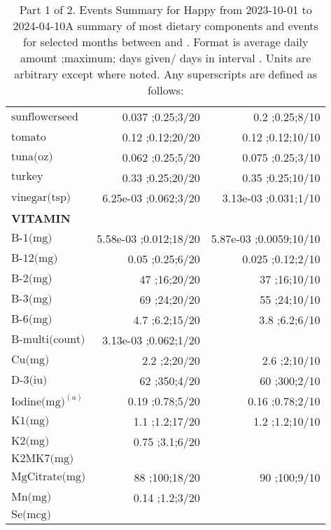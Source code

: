 \begin{table}[H]
\begin{tabular}{|l|r|r|}
$\textrm{sunflowerseed}$&0.037 ;0.25;3/20&0.2 ;0.25;8/10\\
$\textrm{tomato}$&0.12 ;0.12;20/20&0.12 ;0.12;10/10\\
$\textrm{tuna(oz)}$&0.062 ;0.25;5/20&0.075 ;0.25;3/10\\
$\textrm{turkey}$&0.33 ;0.25;20/20&0.35 ;0.25;10/10\\
$\textrm{vinegar(tsp)}$&6.25e-03 ;0.062;3/20&3.13e-03 ;0.031;1/10\\
{\bf VITAMIN}&&\\
$\textrm{B-1(mg)}$&5.58e-03 ;0.012;18/20&5.87e-03 ;0.0059;10/10\\
$\textrm{B-12(mg)}$&0.05 ;0.25;6/20&0.025 ;0.12;2/10\\
$\textrm{B-2(mg)}$&47 ;16;20/20&37 ;16;10/10\\
$\textrm{B-3(mg)}$&69 ;24;20/20&55 ;24;10/10\\
$\textrm{B-6(mg)}$&4.7 ;6.2;15/20&3.8 ;6.2;6/10\\
$\textrm{B-multi(count)}$&3.13e-03 ;0.062;1/20&\\
$\textrm{Cu(mg)}$&2.2 ;2;20/20&2.6 ;2;10/10\\
$\textrm{D-3(iu)}$&62 ;350;4/20&60 ;300;2/10\\
$\textrm{Iodine(mg)}^{\left(a\right)}$&0.19 ;0.78;5/20&0.16 ;0.78;2/10\\
$\textrm{K1(mg)}$&1.1 ;1.2;17/20&1.2 ;1.2;10/10\\
$\textrm{K2(mg)}$&0.75 ;3.1;6/20&\\
$\textrm{K2MK7(mg)}$&&\\
$\textrm{MgCitrate(mg)}$&88 ;100;18/20&90 ;100;9/10\\
$\textrm{Mn(mg)}$&0.14 ;1.2;3/20&\\
$\textrm{Se(mcg)}$&&\\
\hline
\end{tabular}
\caption{Part 1 of 2.  Events Summary for Happy   from 2023-10-01 to 2024-04-10A summary of most dietary components and events  for selected months between \mjmdatemin and \mjmdatemax. Format is average daily amount ;maximum; days given/ days in interval . Units are arbitrary except where noted. Any  superscripts are defined as follows:  \mjmsuperscripts}
\end{table}
